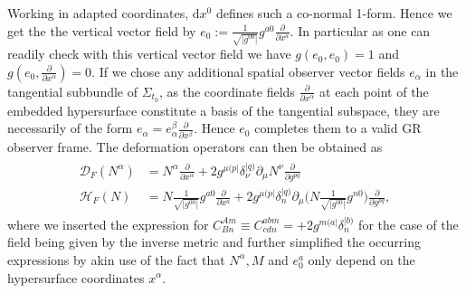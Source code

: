 \documentclass[a4paper,12pt, DIV=14, BCOR=5mm, twoside, headsepline, numbers=noenddot]{scrbook}
\begin{document}
Working in adapted coordinates, $\mathrm{d}x^0$ defines such a co-normal 1-form. Hence we get the the vertical vector field by $e_0 := \frac{1}{\sqrt{\vert g^{00} \vert }} g^{a0} \frac{\partial}{\partial x^a}$.
In particular as one can readily check with this vertical vector field we have $g(e_0,e_0) = 1$ and $g(e_0,\frac{\partial}{\partial x^{\alpha}}) = 0$. If we chose any additional spatial observer vector fields $e_{\alpha}$ in the tangential subbundle of $\Sigma_{t_0}$, as the coordinate fields $\frac{\partial}{\partial x^{\alpha}}$ at each point of the embedded hypersurface constitute a basis of the tangential subspace, they are necessarily of the form $e_{\alpha} = e_{\alpha}^{\beta} \frac{\partial}{\partial x^{\beta}}$. Hence $e_0$ completes them to a valid GR observer frame.
The deformation operators can then be obtained as
\begin{align}
    \begin{aligned}
    \mathcal{D}_F(N^{\alpha}) &= N^{\alpha} \frac{\partial}{\partial x^{\alpha}} + 2 g^{\mu (p\vert} \delta^{\vert q)}_{\nu} \partial_{\mu} N^{\nu} \frac{\partial}{\partial g ^{pq}} \\
    \mathcal{H}_F(N) &= N \frac{1}{\sqrt{\vert g^{00} \vert }} g^{a0} \frac{\partial}{\partial x^a} +2 g^{\mu (p\vert} \delta^{\vert q)}_{n} \partial_{\mu} \biggl (N \frac{1}{\sqrt{\vert g^{00} \vert }} g^{n0} \biggr )  \frac{\partial}{\partial g ^{pq}},
    \end{aligned}
\end{align}
where we inserted the expression for $C^{Am}_{Bn} \equiv C^{abm}_{cdn} = +2g^{m(a\vert}\delta^{\vert b)}_n$ for the case of the field being given by the inverse metric and further simplified the occurring expressions by akin use of the fact that $N^{\alpha},M$ and $e_0^a$ only depend on the hypersurface coordinates $x^\alpha$.
\end{document}
